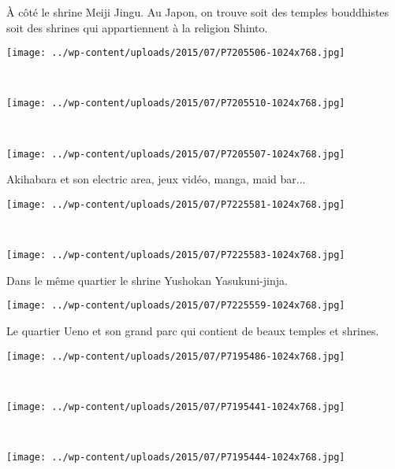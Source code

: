  \`A côté le shrine Meiji Jingu. Au Japon, on trouve soit des temples bouddhistes soit des shrines qui appartiennent à la religion Shinto. 
\begin{center} \texttt{[image: ../wp-content/uploads/2015/07/P7205506-1024x768.jpg]} \end{center}
~
\begin{center} \texttt{[image: ../wp-content/uploads/2015/07/P7205510-1024x768.jpg]} \end{center}
\vspace{-\topsep}
\pagebreak
~\\
\begin{center} \texttt{[image: ../wp-content/uploads/2015/07/P7205507-1024x768.jpg]} \end{center}

 Akihabara et son \og electric area\fg, jeux vidéo, manga, maid bar...
\begin{center} \texttt{[image: ../wp-content/uploads/2015/07/P7225581-1024x768.jpg]} \end{center}
\vspace{-\topsep}
\pagebreak
~\\
\begin{center} \texttt{[image: ../wp-content/uploads/2015/07/P7225583-1024x768.jpg]} \end{center}

  Dans le même quartier le shrine Yushokan Yasukuni-jinja.
\begin{center} \texttt{[image: ../wp-content/uploads/2015/07/P7225559-1024x768.jpg]} \end{center}
\vspace{-\topsep}
\pagebreak

  Le quartier Ueno et son grand parc qui contient de beaux temples et shrines. 
\begin{center} \texttt{[image: ../wp-content/uploads/2015/07/P7195486-1024x768.jpg]} \end{center}
~
\begin{center} \texttt{[image: ../wp-content/uploads/2015/07/P7195441-1024x768.jpg]} \end{center}
\vspace{-\topsep}
\pagebreak
~
\vspace{0.5mm}
\begin{center} \texttt{[image: ../wp-content/uploads/2015/07/P7195444-1024x768.jpg]} \end{center}

